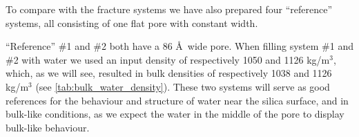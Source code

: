 To compare with the fracture systems we have also prepared four ``reference'' systems, all consisting of one flat pore with constant width. 

``Reference'' \#1 and \#2 both have a 86 \AA\ wide pore. When filling system \#1 and \#2 with water we used an input density of respectively 1050 and 1126 kg/m$^3$, which, as we will see, resulted in bulk densities of respectively 1038 and 1126 kg/m$^3$ (see \cref{tab:bulk_water_density}). These two systems will serve as good references for the behaviour and structure of water near the silica surface, and in bulk-like conditions, as we expect the water in the middle of the pore to display bulk-like behaviour.%
%
%


